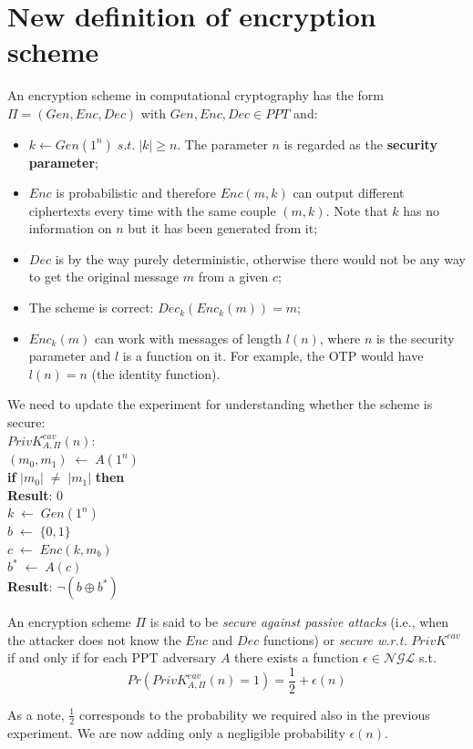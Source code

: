 \documentclass[../main]{subfiles}
\begin{document}
\section{New definition of encryption scheme}
An encryption scheme in computational cryptography has the form $\Pi{} = (Gen, Enc, Dec)$ with $Gen, Enc, Dec \in{} PPT$ and:
\begin{itemize}
    \item $k \leftarrow{} Gen(1^n) \; s.t. \; |k| \ge{} n$. The parameter $n$ is regarded as the \textbf{security parameter};
    \item $Enc$ is probabilistic and therefore $Enc(m, k)$ can output different ciphertexts every time with the same couple $(m, k)$. Note that $k$ has no information on $n$ but it has been generated from it;
    \item $Dec$ is by the way purely deterministic, otherwise there would not be any way to get the original message $m$ from a given $c$;
    \item The scheme is correct: $Dec_k(Enc_k(m)) = m$;
    \item $Enc_k(m)$ can work with messages of length $l(n)$, where $n$ is the security parameter and $l$ is a function on it. For example, the OTP would have $l(n) = n$ (the identity function).
\end{itemize}
We need to update the experiment for understanding whether the scheme is secure:\\
$PrivK^{eav}_{A,\Pi}(n)$:\\
$(m_0,m_1) \; \leftarrow{} \; A(1^n)$\\
\textbf{if} $|m_0| \; \neq{} \; |m_1|$ \textbf{then}\\
\hspace*{20pt}\textbf{Result}: 0\\
$k \; \leftarrow{} \; Gen(1^n)$\\
$b \; \leftarrow{} \; \{0,1\}$\\
$c \; \leftarrow{} \; Enc(k,m_b)$\\
$b^* \; \leftarrow{} \; A(c)$\\
\textbf{Result}: $\neg(b \oplus{} b^*)$
\begin{definition}
    An encryption scheme $\Pi$ is said to be \textit{secure against passive attacks} (i.e., when the attacker does not know the $Enc$ and $Dec$ functions) or \textit{secure w.r.t.} $PrivK^{eav}$
    if and only if for each PPT adversary $A$ there exists a function $\epsilon{} \in{} \mathcal{NGL}$ s.t.
    $$Pr(PrivK^{eav}_{A,\Pi}(n) = 1) = \frac{1}{2} + \epsilon(n)$$
\end{definition}
As a note, $\frac{1}{2}$ corresponds to the probability we required also in the previous experiment. We are now adding only a negligible probability $\epsilon(n)$.
\end{document}
